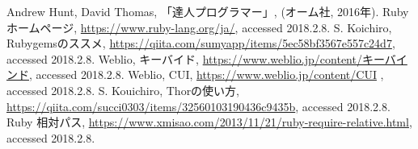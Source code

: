 \begin{thebibliography}{9}
 Andrew Hunt, David Thomas, 「達人プログラマー」, (オーム社, 2016年).
 Ruby ホームページ, \url{https://www.ruby-lang.org/ja/}, accessed 2018.2.8.
 S. Koichiro, Rubygemsのススメ, \url{https://qiita.com/sumyapp/items/5ec58bf3567e557c24d7}, accessed 2018.2.8.
 Weblio, キーバイド, \url{https://www.weblio.jp/content/キーバインド}, accessed 2018.2.8.
 Weblio, CUI, \url{https://www.weblio.jp/content/CUI} , accessed 2018.2.8.
 S. Kouichiro, Thorの使い方, \url{https://qiita.com/succi0303/items/32560103190436c9435b}, accessed 2018.2.8.
 Ruby 相対パス, \url{https://www.xmisao.com/2013/11/21/ruby-require-relative.html}, accessed 2018.2.8.
\end{thebibliography} 